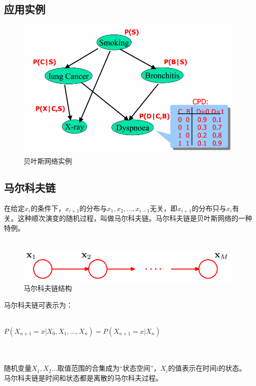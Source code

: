 \subsection*{应用实例}
\begin{frame}
\begin{figure}
		\centering
		\includegraphics[scale=0.3]{topic/BayesianNetwork/instance.png}
		\caption{贝叶斯网络实例}
		\label{0-005}
\end{figure}
\end{frame}

\subsection*{马尔科夫链}
\begin{frame}
	在给定$x_i$的条件下，$x_{i+1}$的分布与$x_1,x_2,...,x_{i-1}$无关，即$x_{i+1}$的分布只与$x_i$有关。这种顺次演变的随机过程，叫做马尔科夫链。马尔科夫链是贝叶斯网络的一种特例。
	~\\
	~\\
	\begin{figure}
		\centering
		\includegraphics[scale=0.4]{topic/BayesianNetwork/markov.png}
		\caption{马尔科夫链结构}
		\label{0-006}
	\end{figure}
\end{frame}

\begin{frame}
	马尔科夫链可表示为：
	~\\
	~\\
	\centerline{{\large $P(X_{n+1}=x|X_0,X_1,...,X_n)=P(X_{n+1}=x|X_n)$}}
	~\\
	~\\
	随机变量$X_1,X_2...$取值范围的合集成为“状态空间”，$X_i$的值表示在时间i的状态。马尔科夫链是时间和状态都是离散的马尔科夫过程。
\end{frame}

